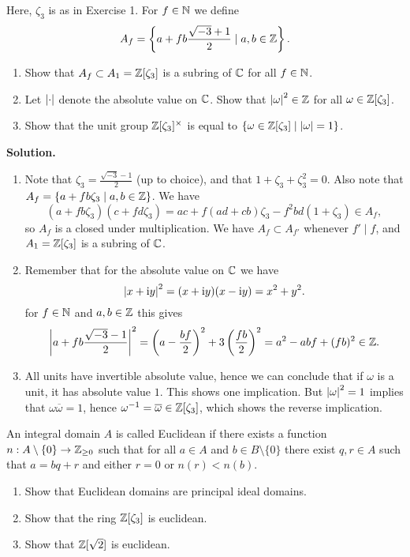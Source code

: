 \documentclass[a4paper,11pt]{article}
\begin{document}
Here, $\zeta_3$ is as in Exercise 1. For $f \in \mathbb{N}$ we define
\begin{equation*}
    A_f = \left \{ a + fb \frac{\sqrt{-3} + 1}2 \mid a, b \in \mathbb{Z} \right \}.
\end{equation*}
\begin{enumerate}
    \item Show that $A_f \subset A_1 = \mathbb{Z}[\zeta_3]$ is a subring of 
        $\mathbb{C}$ for all $f \in \mathbb{N}$. 
    \item Let $\left\lvert \cdot \right\rvert$ denote the absolute value on $\mathbb{C}$. Show that 
        $\left\lvert \omega \right\rvert^2 \in \mathbb{Z}$ for all $\omega \in \mathbb{Z}[\zeta_3]$. 
    \item Show that the unit group $\mathbb{Z}[\zeta_3]^\times$ is equal to
        $\{\omega \in \mathbb{Z}[\zeta_3] \mid \left\lvert \omega \right\rvert = 1\}$. 
\end{enumerate}
\textbf{Solution.}
\begin{enumerate}
    \item Note that $\zeta_3 = \frac{\sqrt{-3} - 1}2$ (up to choice), and that 
        $1 + \zeta_3 + \zeta_3^2 = 0$. 
        Also note that $A_f = \{a + fb \zeta_3 \mid a, b \in \mathbb{Z}\}$.
        We have $$(a + fb \zeta_3)(c + fd \zeta_3) = ac + f(ad + cb)\zeta_3 -
        f^2bd(1+\zeta_3) \in A_f,$$
        so $A_f$ is a closed under multiplication. We have $A_f \subset A_{f'}$
        whenever $f' \mid f$, 
        and $A_1 = \mathbb{Z}[\zeta_3]$ is a subring of $\mathbb{C}$. 
    \item Remember that for the absolute value on $\mathbb{C}$ we have
        \begin{equation*}
            \left\lvert x + \mathrm i y \right\rvert^2 = (x + \mathrm i y)(x - \mathrm i y) = x^2 + y^2.
        \end{equation*}
        for $f \in \mathbb{N}$ and $a, b \in \mathbb{Z}$ this gives
        \begin{equation*}
            \left\lvert a + fb \frac{\sqrt{-3}-1}2 \right\rvert^2 = \left (a - \frac {bf}2\right)^2
            + 3\left( \frac {fb}2 \right)^2 = a^2 - abf + (fb)^2 \in \mathbb{Z}. 
        \end{equation*}
    \item All units have invertible absolute value, hence we can conclude
        that if $\omega$ is a unit, it has absolute value $1$. This
        shows one implication. But $\left\lvert \omega \right\rvert^2 = 1$  
        implies that $\omega \overline \omega = 1$, hence $\omega^{-1} = 
        \overline \omega \in \mathbb{Z}[\zeta_3]$, which shows the reverse implication.
\end{enumerate}

An integral domain $A$ is called Euclidean if there exists a function 
$n: A \setminus \{0\} \to \mathbb{Z}_{\geq 0}$ such that for all $a \in A$ and
$b \in B \setminus \{0\}$ there exist $q, r \in A$ such that 
$a = bq + r$ and either $r = 0$ or $n(r) < n(b)$.
\begin{enumerate}
    \item Show that Euclidean domains are principal ideal domains.
    \item Show that the ring $\mathbb{Z}[\zeta_3]$ is euclidean.
    \item Show that $\mathbb{Z}[\sqrt 2]$ is euclidean.
\end{enumerate}
\end{document}
